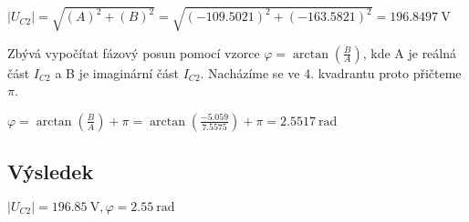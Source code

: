 \vspace{0.25cm}
$|U_{C2}| = \sqrt{(A)^2 + (B)^2} = \sqrt{(-109.5021)^2 + (-163.5821)^2} = 196.8497\: \si{\volt}$

\begin{large}
\vspace{1cm} \flushleft
Zbývá vypočítat fázový posun pomocí vzorce $\varphi = \arctan (\frac{B}{A})$, kde A je reálná část $I_{C2}$ a B je imaginární část $I_{C2}$. Nacházíme se ve 4. kvadrantu proto přičteme $\pi$.
\end{large}

\vspace{0.5cm}
$\varphi = \arctan (\frac{B}{A}) + \pi = \arctan (\frac{-5.059}{7.5575}) + \pi = 2.5517\: \si{\radian}$

\subsection{Výsledek}

$|U_{C2}| = 196.85\: \si{\volt}, \varphi = 2.55\: \si{\radian}$